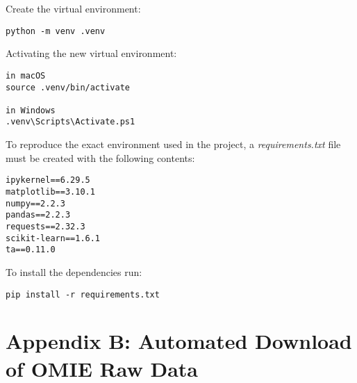 \documentclass[12pt]{report} %
\begin{document}
\noindent Create the virtual environment:
\begin{verbatim}
python -m venv .venv
\end{verbatim}

\noindent Activating the new virtual environment:
\begin{verbatim}
in macOS
source .venv/bin/activate

in Windows
.venv\Scripts\Activate.ps1
\end{verbatim}

\noindent To reproduce the exact environment used in the project, a \textit{requirements.txt} file must be created with the following contents:
\begin{verbatim}
ipykernel==6.29.5
matplotlib==3.10.1
numpy==2.2.3
pandas==2.2.3
requests==2.32.3
scikit-learn==1.6.1
ta==0.11.0
\end{verbatim}

\noindent To install the dependencies run:
\begin{verbatim}
pip install -r requirements.txt 
\end{verbatim}



\chapter* {Appendix B: Automated Download of OMIE Raw Data}
\label{app:appendix_b_data_scrapping}
\end{document}
